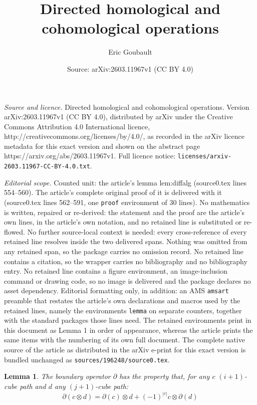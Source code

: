 \documentclass[10pt,a4paper]{amsart}
\title{Directed homological and cohomological operations}
\author{Eric Goubault}
\date{Source: arXiv:2603.11967v1 (CC BY 4.0)}
\newtheorem{lemma}{Lemma}
\begin{document}
\maketitle

\noindent\emph{Source and licence.} Directed homological and cohomological operations. Version arXiv:2603.11967v1 (CC BY 4.0), distributed by arXiv under the Creative Commons Attribution 4.0 International licence, http://creativecommons.org/licenses/by/4.0/, as recorded in the arXiv licence metadata for this exact version and shown on the abstract page https://arxiv.org/abs/2603.11967v1. Full licence notice: \texttt{licenses/arxiv-2603.11967-CC-BY-4.0.txt}.\par\smallskip

\noindent\textit{Editorial scope.} Counted unit: the article's lemma lem:diffalg (source0.tex lines 554--560). The article's complete original proof of it is delivered with it (source0.tex lines 562--591, one \texttt{proof} environment of 30 lines). No mathematics is written, repaired or re-derived: the statement and the proof are the article's own lines, in the article's own notation, and no retained line is substituted or re-flowed.  No further source-local context is needed: every cross-reference of every retained line resolves inside the two delivered spans.  Nothing was omitted from any retained span, so the package carries no omission record.  No retained line contains a citation, so the wrapper carries no bibliography and no bibliography entry.  No retained line contains a figure environment, an image-inclusion command or drawing code, so no image is delivered and the package declares no asset dependency.  Editorial formatting only, in addition: an AMS \texttt{amsart} preamble that restates the article's own declarations and macros used by the retained lines, namely the environments \texttt{lemma} on separate counters, together with the standard packages those lines need.  The retained environments print in this document as Lemma 1 in order of appearance, whereas the article prints the same items with the numbering of its own full document.  The complete native source of the article as distributed in the arXiv e-print for this exact version is bundled unchanged as \texttt{sources/196248/source0.tex}.
\begin{lemma}
\label{lem:diffalg}
    The boundary operator $\partial$ has the property that, for any $c$ $(i+1)$-cube path and $d$ any $(j+1)$-cube path:
$$
\partial(c\otimes d) = \partial(c)\otimes d +(-1)^{|c|} c\otimes \partial(d)
$$
\end{lemma}
\end{document}
